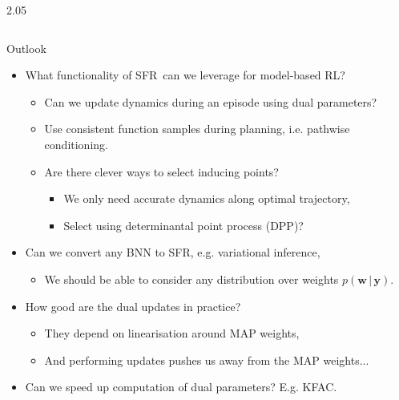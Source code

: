 \documentclass[final,12pt]{beamer}
\newlength{\colwidth}
\newcommand{\mbf}[1]{\mathbf{#1}}
\renewcommand{\mid}{\,|\,}
\newcommand{\vy}{\mbf{y}}
\newcommand{\our}{SFR}
\newcommand{\weights}{\ensuremath{\mathbf{w}}}
\begin{document}
\begin{frame}[t]
\begin{columns}[t]
\begin{column}{2.05\colwidth}
\begin{columns}[t]
\begin{column}{\colwidth}
\begin{block}{Outlook}
   \begin{itemize}
     \item What functionality of \our \ can we leverage for model-based RL?
    \begin{itemize}
        \item Can we update dynamics during an episode using dual parameters?
        \item Use consistent function samples during planning, i.e. pathwise conditioning.
        \item Are there clever ways to select inducing points?
        \begin{itemize}
          \item We only need accurate dynamics along optimal trajectory,
          \item Select using determinantal point process (DPP)?
        \end{itemize}
    \end{itemize}
     \item Can we convert any BNN to SFR, e.g. variational inference,
    \begin{itemize}
        \item We should be able to consider any distribution over weights $p(\weights \mid \vy)$.
    \end{itemize}
     \item How good are the dual updates in practice?
    \begin{itemize}
        \item They depend on linearisation around MAP weights,
        \item And performing updates pushes us away from the MAP weights...
    \end{itemize}
     \item Can we speed up computation of dual parameters? E.g. KFAC.
   \end{itemize}


\end{block}
\end{column}
\end{columns}
\end{column}
\end{columns}
\end{frame}
\end{document}
